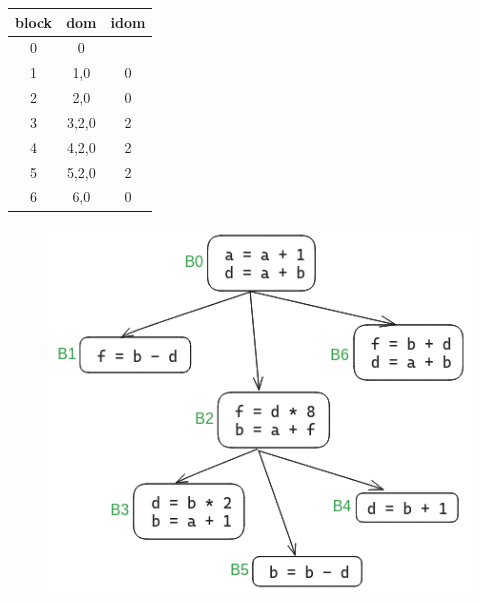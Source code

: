 \documentclass{article}
\begin{document}
    \begin{center}
        \begin{tabular}{ c c c }
            \hline
            block   & dom       & idom \\
            \hline
            0       & 0         &       \\
            1       & 1,0       & 0      \\
            2       & 2,0       & 0     \\
            3       & 3,2,0     & 2     \\
            4       & 4,2,0     & 2     \\
            5       & 5,2,0     & 2     \\
            6       & 6,0       & 0     \\
            \hline
        \end{tabular}
    \end{center}

    \begin{figure}[H]
        \includegraphics[width=1\textwidth]{hw4-dom4.png}
    \end{figure}
\end{document}
